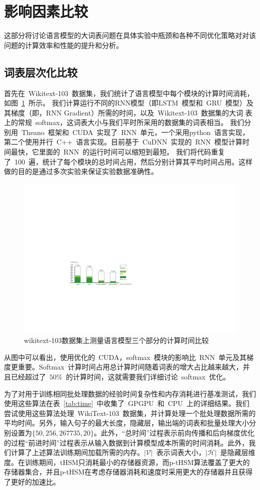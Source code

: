 \section{影响因素比较}
这部分将讨论语言模型的大词表问题在具体实验中瓶颈和各种不同优化策略对对该问题的计算效率和性能的提升和分析。
\subsection{词表层次化比较}
首先在~Wikitext-103~数据集，我们统计了语言模型中每个模块的计算时间消耗，如图~\ref{fig:rnn_timing}~所示。 我们计算运行不同的RNN模型（即LSTM~模型和~GRU~模型）及其梯度（即，RNN Gradient）所需的时间，以及~Wikitext-103~数据集的大词
表上的常规~softmax，这词表大小与我们平时所采用的数据集的词表相当。 我们分别用~Theano~框架和~CUDA~实现了~RNN~单元，一个采用python~语言实现，第二个使用并行~C++~语言实现。目前基于~CuDNN~实现的~RNN~模型计算时间最快，它里面的~RNN~的运行时间可以缩短到最短。 我们将代码重复了~100~遍，统计了每个模块的总时间占用，然后分别计算其平均时间占用。这样做的目的是通过多次实验来保证实验数据准确性。
\begin{figure}[!t]
  \centering
  \includegraphics[width=.9\columnwidth]{./figures/rnn_timing.pdf}
  \caption{wikitext-103数据集上测量语言模型三个部分的计算时间比较}\label{fig:rnn_timing}
\end{figure}


从图中可以看出，使用优化的~CUDA，softmax~模块的影响比~RNN~单元及其梯度更重要。Softmax~计算时间占用总计算时间随着词表的增大占比越来越大，并且已经超过了~$50\%$~的计算时间，这就需要我们详细讨论~softmax~优化。

为了对用于训练相同批处理数据的经验时间复杂性和内存消耗进行基准测试，我们使用这些算法在表~\ref{tab:time}~中收集了~GPGPU~和~CPU~上的详细结果。我们尝试使用这些算法处理~WikiText-103~数据集，并计算处理一个批处理数据所需的平均时间。另外，输入句子的最大长度，隐藏层，输出端的词表和批量处理大小分别设置为$\{50, 256, 267735, 20\}$。此外，``总时间''过程表示前向传播和后向梯度优化的过程``前进时间''过程表示从输入数据到计算模型成本所需的时间消耗。此外，我们计算了上述算法训练期间加载所需的内存。$\mathcal{|V|}$~表示词表大小，$\mathcal{|H|}$~是隐藏层维度。在训练期间，tHSM只消耗最小的存储器资源，而p-tHSM算法覆盖了更大的存储器集合，并且p-tHSM在考虑存储器消耗和速度时采用更大的存储器并且获得了更好的加速比。

